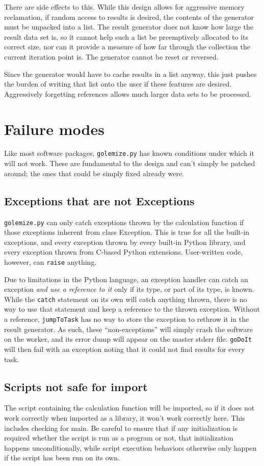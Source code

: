 \documentclass[11pt,ebook,oneside,final]{memoir} %
\begin{document}
There are side effects to this. While this design allows for aggressive memory reclamation, if random access to results is desired, the contents of the generator must be unpacked into a list. The result generator does not know how large the result data set is, so it cannot help such a list be preemptively allocated to its correct size, nor can it provide a measure of how far through the collection the current iteration point is. The generator cannot be reset or reversed.

Since the generator would have to cache results in a list anyway, this just pushes the burden of writing that list onto the user if these features are desired. Aggressively forgetting references allows much larger data sets to be processed.

\chapter{Failure modes}
Like most software packages, \texttt{golemize.py} has known conditions under which it will not work. These are fundamental to the design and can't simply be patched around; the ones that could be simply fixed already were.
\section{Exceptions that are not Exceptions}
\texttt{golemize.py} can only catch exceptions thrown by the calculation function if those exceptions inherent from class Exception. This is true for all the built-in exceptions, and every exception thrown by every built-in Python library, and every exception thrown from C-based Python extensions. User-written code, however, can \texttt{raise} anything.

Due to limitations in the Python language, an exception handler can catch an exception \emph{and use a reference to it} only if its type, or part of its type, is known. While the \texttt{catch} statement on its own will catch anything thrown, there is no way to use that statement and keep a reference to the thrown exception. Without a reference, \texttt{jumpToTask} has no way to store the exception to rethrow it in the result generator. As such, these ``non-exceptions'' will simply crash the software on the worker, and its error dump will appear on the master stderr file. \texttt{goDoIt} will then fail with an exception noting that it could not find results for every task.
\section{Scripts not safe for import}
The script containing the calculation function will be imported, so if it does not work correctly when imported as a library, it won't work correctly here. This includes checking for \textunderscore\textunderscore{}main\textunderscore\textunderscore. Be careful to ensure that if any initialization is required whether the script is run as a program or not, that initialization happens unconditionally, while script execution behaviors otherwise only happen if the script has been run on its own.
\end{document}
